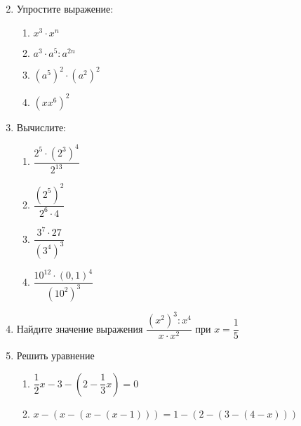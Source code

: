 \documentclass[12pt, a4paper]{article}
\begin{document}
\begin{enumerate}
\begin{multicols}{2}
\begin{enumerate}[label=\asbuk*)]
		\end{enumerate}
	\end{multicols}
	\item Упростите выражение:
	\begin{multicols}{2}
		\begin{enumerate}[label=\asbuk*)]
			\item $x^3\cdot x^n$
			\item $a^3\cdot a^5 : a^{2n}$
			\item $(a^5)^2 \cdot (a^2)^2$
			\item $(xx^6)^2$
		\end{enumerate}
	\end{multicols}
	\item Вычислите:
	\begin{multicols}{2}
		\begin{enumerate}[label=\asbuk*)]
			\item $\dfrac{2^5\cdot(2^3)^4}{2^13}$
			\item $\dfrac{(2^5)^2}{2^6\cdot4}$
			\item $\dfrac{3^7\cdot27}{(3^4)^3}$
			\item $\dfrac{10^12\cdot(0,1)^4}{(10^2)^3}$
		\end{enumerate}
	\end{multicols}
	\item Найдите значение выражения $\dfrac{(x^2)^3:x^4}{x\cdot x^2}$ при $x=\dfrac{1}{5}$
	\item Решить уравнение
	\begin{multicols}{2}
		\begin{enumerate}[label=\asbuk*)]
			\item $\dfrac{1}{2}x-3-\left(2-\dfrac{1}{3}x\right)=0$
			\item $x-(x-(x-(x-1)))=1-(2-(3-(4-x)))$
		\end{enumerate}
	\end{multicols}
\end{enumerate}
\end{document}
